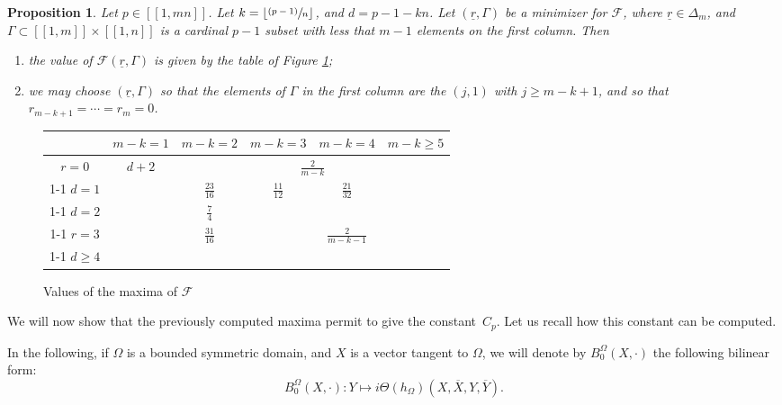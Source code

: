 \documentclass[JEP,XML,SOM,Unicode, NoEqCountersInSection,NoFloatCountersInSection,published]{cedram}
\let\mathcal\mathscr
\newcommand{\psfrac}[2]{\sfrac{(#1)}{#2}}
\newcommand{\llbracket}{[\![}
\newcommand{\rrbracket}{]\!]}
\theoremstyle{theorem}
\newtheorem{proposition}{Proposition} [section]
\theoremstyle{definition}
\begin{document}
\begin{proposition} \label{propCp}
Let $p \in \llbracket 1, mn \rrbracket$. Let $k = \lfloor \psfrac{p - 1}{n} \rfloor$, and $d = p - 1 - kn$. Let $(\underline{r}, \Gamma)$ be a minimizer for $\mathcal F$, where $\underline{r} \in \Delta_m$, and $\Gamma \subset \llbracket 1, m \rrbracket \times \llbracket 1, n \rrbracket$ is a cardinal $p - 1$ subset with less that $m-1$ elements on the first column. Then
\begin{enumerate}
\item the value of $\mathcal F(\underline{r}, \Gamma)$ is given by the table of Figure \ref{figF};
\item we may choose $(\underline{r}, \Gamma)$ so that the elements of $\Gamma$ in the first column are the $(j, 1)$ with $j \geq m-k+1$, and so that $r_{m-k+1} =\cdots= r_{m} = 0$.
\end{enumerate}
\end{proposition}

\begin{figure}[htb]
\centering
\setlength{\tabcolsep}{5pt}
\renewcommand{\arraystretch}{1.5}
\begin{tabular}{|c|c|c|c|c|c|}
\hline
& $m-k = 1$ & $m-k=2$ & $m-k = 3$ & $m-k = 4$ & $m- k \geq 5$ \\
\hline
$r =0$ & \multirow{4}{*}{$d + 2$} & \multicolumn{4}{c|}{$\frac{2}{m-k}$} \\
\cline{1-1}\cline{3-6}
$d =1$ & & $\frac{23}{16}$ & $\frac{11}{12}$ & $\frac{21}{32}$ & \\
\cline{1-1}\cline{3-5}
$d = 2$ & & $\frac{7}{4}$ & \multicolumn{3}{c|}{} \\
\cline{1-1}\cline{3-3}
$r = 3$ & & $\frac{31}{16}$ & \multicolumn{3}{c|}{$\frac{2}{m-k-1}$} \\
\cline{1-1}\cline{3-3}
$d \geq 4$ & & \multicolumn{4}{c|}{} \\
\hline
\end{tabular}
\caption{Values of the maxima of $\mathcal F$} \label{figF}
\end{figure}

We will now show that the previously computed maxima permit to give the constant~$C_p$. Let us recall how this constant can be computed.

In the following, if $\Omega$ is a bounded symmetric domain, and $X$ is a vector tangent to $\Omega$, we will denote by $B_0^{\Omega}(X, \cdot)$ the following bilinear form:
\[
B_0^\Omega (X, \cdot) : Y \longmapsto i \Theta(h_{\Omega})(X, \overline{X}, Y, \overline{Y}).
\]
\end{document}
